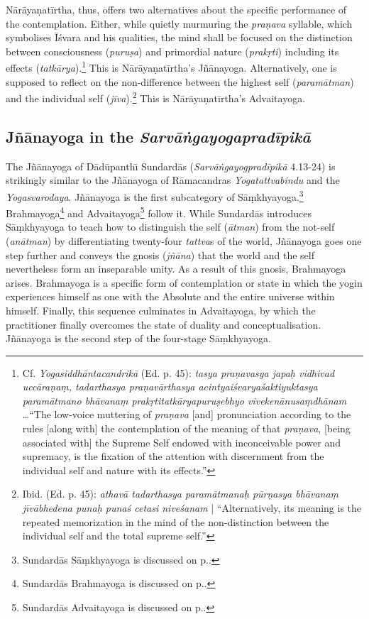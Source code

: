 Nārāyaṇatīrtha, thus, offers two alternatives about the specific performance of the contemplation. Either, while quietly murmuring the \textit{praṇava} syllable, which symbolises Īśvara and his qualities, the mind shall be focused on the distinction between consciousness (\textit{puruṣa}) and primordial nature (\textit{prakṛti}) including its effects (\textit{tatkārya}).\footnote{Cf. \textit{Yogasiddhāntacandrikā} (Ed. p. 45): \textit{tasya praṇavasya japaḥ vidhivad uccāraṇaṃ, tadarthasya praṇavārthasya acintyaiśvaryaśaktiyuktasya paramātmano bhāvanaṃ prakṛtitatkāryapuruṣebhyo vivekenānusaṃdhānam} \ldots ``The low-voice muttering of \textit{praṇava} [and] pronunciation according to the rules [along with] the contemplation of the meaning of that \textit{praṇava}, [being associated with] the Supreme Self endowed with inconceivable power and supremacy, is the fixation of the attention with discernment from the individual self and nature with its effects.''} This is Nārāyaṇatīrtha's Jñānayoga.\label{advaitayogaintrocandrika} Alternatively, one is supposed to reflect on the non-difference between the highest self (\textit{paramātman}) and the individual self (\textit{jīva}).\footnote{Ibid. (Ed. p. 45): \textit{athavā tadarthasya paramātmanaḥ pūrṇasya bhāvanaṃ jīvābhedena punaḥ punaś cetasi niveśanam} | ``Alternatively, its meaning is the repeated memorization in the mind of the non-distinction between the individual self and the total supreme self.''} This is Nārāyaṇatīrtha's Advaitayoga.

\subsection{Jñānayoga in the \textit{Sarvāṅgayogapradīpikā}}

The Jñānayoga of Dādūpanthı̄ Sundardās (\emph{Sarvāṅgayogpradīpikā} 4.13-24) is strikingly similar to the Jñānayoga of Rāmacandras \textit{Yogatattvabindu} and the \textit{Yogasvarodaya}. Jñānayoga is the first subcategory of Sāṃkhyayoga.\footnote{Sundardās Sāṃkhyayoga is discussed on p.\pageref{samkhyayoga}.} Brahmayoga\footnote{Sundardās Brahmayoga is discussed on p.\pageref{sundarbrahma}.} and Advaitayoga\footnote{Sundardās Advaitayoga is discussed on p.\pageref{sundaradvaita}.} follow it. While Sundardās introduces Sāṃkhyayoga to teach how to distinguish the self (\textit{ātman}) from the not-self (\textit{anātman}) by differentiating twenty-four \textit{tattva}s of the world, Jñānayoga goes one step further and conveys the gnosis (\textit{jñāna}) that the world and the self nevertheless form an inseparable unity. As a result of this gnosis, Brahmayoga arises. Brahmayoga is a specific form of contemplation or state in which the yogin experiences himself as one with the Absolute and the entire universe within himself. Finally, this sequence culminates in Advaitayoga, by which the practitioner finally overcomes the state of duality and conceptualisation. Jñānayoga is the second step of the four-stage Sāṃkhyayoga.

